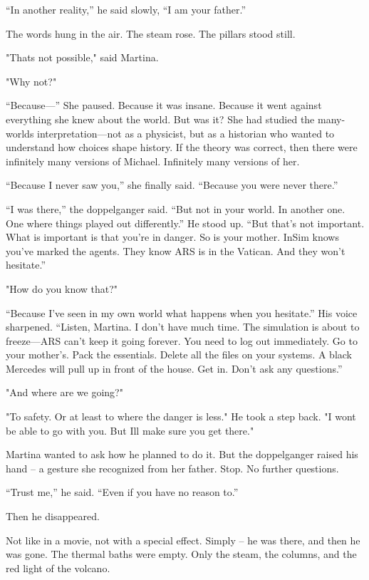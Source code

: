 \documentclass[
]{article}
\begin{document}
``In another reality,'' he said slowly, ``I am your father.''

The words hung in the air. The steam rose. The pillars stood still.

"That\textquotesingle s not possible," said Martina.

"Why not?"

``Because---'' She paused. Because it was insane. Because it went against everything she knew about the world. But was it? She had studied the many-worlds interpretation---not as a physicist, but as a historian who wanted to understand how choices shape history. If the theory was correct, then there were infinitely many versions of Michael. Infinitely many versions of her.

``Because I never saw you,'' she finally said. ``Because you were never there.''

``I was there,'' the doppelganger said. ``But not in your world. In another one. One where things played out differently.'' He stood up. ``But that's not important. What is important is that you're in danger. So is your mother. InSim knows you've marked the agents. They know ARS is in the Vatican. And they won't hesitate.''

"How do you know that?"

``Because I've seen in my own world what happens when you hesitate.'' His voice sharpened. ``Listen, Martina. I don't have much time. The simulation is about to freeze---ARS can't keep it going forever. You need to log out immediately. Go to your mother's. Pack the essentials. Delete all the files on your systems. A black Mercedes will pull up in front of the house. Get in. Don't ask any questions.''

"And where are we going?"

"To safety. Or at least to where the danger is less." He took a step back. "I won\textquotesingle t be able to go with you. But I\textquotesingle ll make sure you get there."

Martina wanted to ask how he planned to do it. But the doppelganger raised his hand -- a gesture she recognized from her father. Stop. No further questions.

``Trust me,'' he said. ``Even if you have no reason to.''

Then he disappeared.

Not like in a movie, not with a special effect. Simply -- he was there, and then he was gone. The thermal baths were empty. Only the steam, the columns, and the red light of the volcano.
\end{document}
